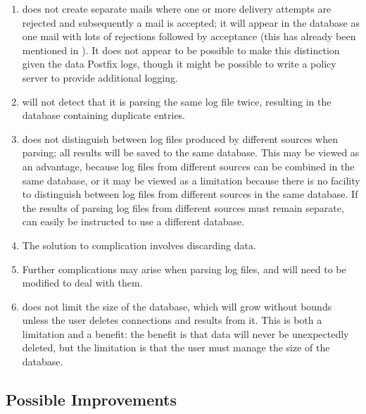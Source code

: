 \begin{enumerate}
    \item \parsername{} does not create separate mails where one or more
        delivery attempts are rejected and subsequently a mail is accepted;
        it will appear in the database as one mail with lots of rejections
        followed by acceptance (this has already been mentioned in
        ).  It does not appear to be possible
        to make this distinction given the data Postfix logs, though it
        might be possible to write a policy server to provide additional
        logging.

    \item \parsername{} will not detect that it is parsing the same log file
        twice, resulting in the database containing duplicate entries.

    \item \parsername{} does not distinguish between log files produced by
        different sources when parsing; all results will be saved to the
        same database.  This may be viewed as an advantage, because log
        files from different sources can be combined in the same database,
        or it may be viewed as a limitation because there is no facility to
        distinguish between log files from different sources in the same
        database.  If the results of parsing log files from different
        sources must remain separate, \parsername{} can easily be
        instructed to use a different database.

    \item The solution to complication  involves discarding data.

    \item Further complications may arise when parsing log files, and
        \parsername{} will need to be modified to deal with them.

    \item \parsername{} does not limit the size of the database, which will
        grow without bounds unless the user deletes connections and results
        from it.  This is both a limitation and a benefit: the benefit is
        that data will never be unexpectedly deleted, but the limitation is
        that the user must manage the size of the database.

\end{enumerate}

\subsection{Possible Improvements}

